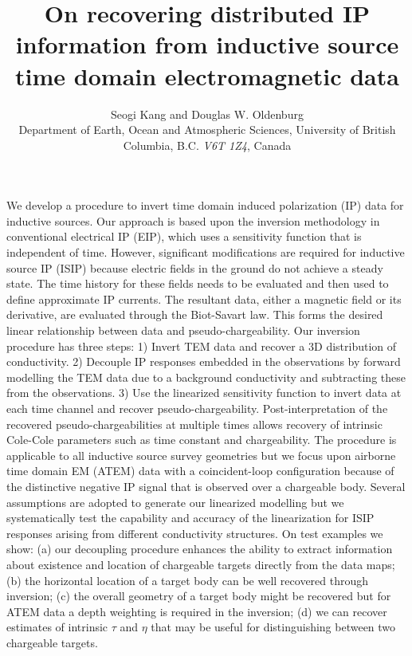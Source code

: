 \documentclass[extra,mreferee]{gji}
\author[Seogi Kang and Douglas W. Oldenburg]
   {Seogi Kang and Douglas W. Oldenburg \\
    Department of Earth, Ocean and Atmospheric Sciences,
    University of British Columbia,
    B.C. \emph{V6T 1Z4}, Canada
  }
\title{On recovering distributed IP information from inductive source time domain electromagnetic data}
\begin{document}
\label{firstpage}

\maketitle

\begin{summary}
We develop a procedure to invert time domain induced polarization (IP) data for inductive sources. Our approach is based upon the inversion methodology in conventional electrical IP (EIP), which uses a sensitivity function that is independent of time. However, significant modifications are required for inductive source IP (ISIP) because electric fields in the ground do not achieve a steady state. The time history for these fields needs to be evaluated and then used to define approximate IP currents. The resultant data, either a magnetic field or its derivative, are evaluated through the Biot-Savart law. This forms the desired linear relationship between data and pseudo-chargeability.
Our inversion procedure has three steps:
1) Invert TEM data and recover a 3D distribution of conductivity.
2) Decouple IP responses embedded in the observations by forward modelling the TEM data due to a background conductivity and subtracting these from the observations. 3) Use the linearized sensitivity function to invert data at each time channel and recover pseudo-chargeability. Post-interpretation of the recovered pseudo-chargeabilities at multiple times allows recovery of intrinsic Cole-Cole parameters such as time constant and chargeability. The procedure is applicable to all inductive source survey geometries but we focus upon airborne time domain EM (ATEM) data with a coincident-loop configuration because of the distinctive negative IP signal that is observed over a chargeable body. 
Several assumptions are adopted to generate our linearized modelling but we systematically test the capability and accuracy of the linearization for ISIP responses arising from different conductivity structures. On test examples we show: (a) our decoupling procedure enhances the ability to extract information about existence and location of chargeable targets directly from the data maps; (b) the horizontal location of a target body can be well recovered through inversion; (c) the overall geometry of a target body might be recovered but for ATEM data a depth weighting is required in the inversion; (d)  we can recover estimates of intrinsic $\tau$ and $\eta$ that may be useful for distinguishing between two chargeable targets. 
\end{summary}
\end{document}
